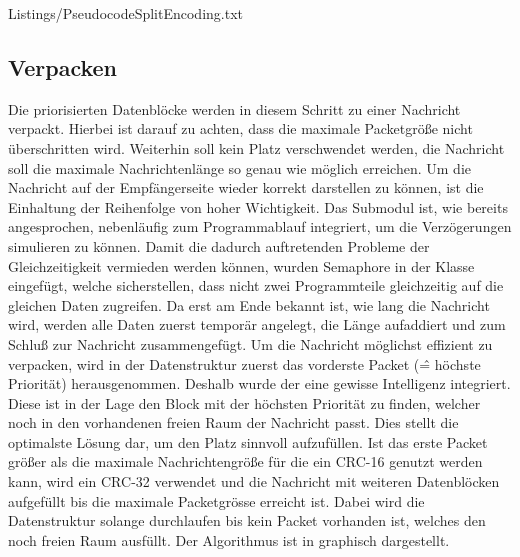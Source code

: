 \lstset{language=pseudo}
\lstset{commentstyle=\textit}
 {Listings/PseudocodeSplitEncoding.txt}

\subsection{Verpacken}

Die priorisierten Datenblöcke werden in diesem Schritt zu einer Nachricht
verpackt. Hierbei ist darauf zu achten, dass die maximale Packetgröße
nicht überschritten wird. Weiterhin soll kein Platz verschwendet werden, \dahe
die Nachricht soll die maximale Nachrichtenlänge so genau wie möglich erreichen.
Um die Nachricht auf der Empfängerseite wieder korrekt darstellen zu können, ist
die Einhaltung der Reihenfolge von hoher Wichtigkeit. \newline
Das Submodul ist, wie bereits angesprochen, nebenläufig zum Programmablauf
integriert, um die Verzögerungen simulieren zu können. Damit die
dadurch auftretenden Probleme der Gleichzeitigkeit vermieden werden können,
wurden Semaphore in der Klasse 
eingefügt, welche sicherstellen, dass nicht zwei Programmteile gleichzeitig auf
die gleichen Daten zugreifen. Da erst am Ende bekannt ist, wie lang die
Nachricht wird, werden alle Daten zuerst temporär angelegt, die Länge aufaddiert
und zum Schluß zur Nachricht zusammengefügt.
Um die Nachricht möglichst effizient zu verpacken, wird in der
Datenstruktur  zuerst das vorderste Packet
(\^= höchste Priorität) herausgenommen. Deshalb wurde der
 eine gewisse Intelligenz integriert.
Diese ist in der Lage den Block mit der höchsten Priorität zu finden, welcher
noch in den vorhandenen freien Raum der Nachricht passt. Dies stellt die
optimalste Lösung dar, um den Platz sinnvoll aufzufüllen. \newline 
Ist das erste Packet größer als die maximale Nachrichtengröße für die ein CRC-16
genutzt werden kann, wird ein CRC-32 verwendet und die Nachricht mit weiteren
Datenblöcken aufgefüllt bis die maximale Packetgrösse erreicht ist. Dabei wird
die Datenstruktur  solange
durchlaufen bis kein Packet vorhanden ist, welches den noch freien Raum
ausfüllt. \newline 
Der Algorithmus ist in  graphisch dargestellt.

